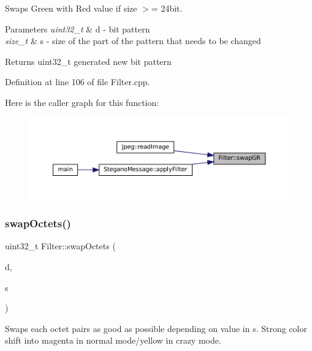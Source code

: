 Swaps Green with Red value if size $>$= 24bit. 


\begin{DoxyParams}{Parameters}
{\em uint32\+\_\+t} & d -\/ bit pattern \\
\hline
{\em size\+\_\+t} & s -\/ size of the part of the pattern that needs to be changed \\
\hline
\end{DoxyParams}
\begin{DoxyReturn}{Returns}
uint32\+\_\+t generated new bit pattern 
\end{DoxyReturn}


Definition at line 106 of file Filter.\+cpp.

Here is the caller graph for this function\+:\nopagebreak
\begin{figure}[H]
\begin{center}
\leavevmode
\includegraphics[width=350pt]{classFilter_ad6f109289f21be75db0a1351c86d3143_icgraph}
\end{center}
\end{figure}
\mbox{\label{classFilter_aeb85c27a3d80540f2bd4b5f314543d4c}} 
\subsubsection{\texorpdfstring{swapOctets()}{swapOctets()}}
{\footnotesize\ttfamily uint32\+\_\+t Filter\+::swap\+Octets (\begin{DoxyParamCaption}\item[{uint32\+\_\+t}]{d,  }\item[{size\+\_\+t}]{s }\end{DoxyParamCaption})\hspace{0.3cm}{\ttfamily [static]}}



Swaps each octet pairs as good as possible depending on value in s. Strong color shift into magenta in normal mode/yellow in crazy mode. 


